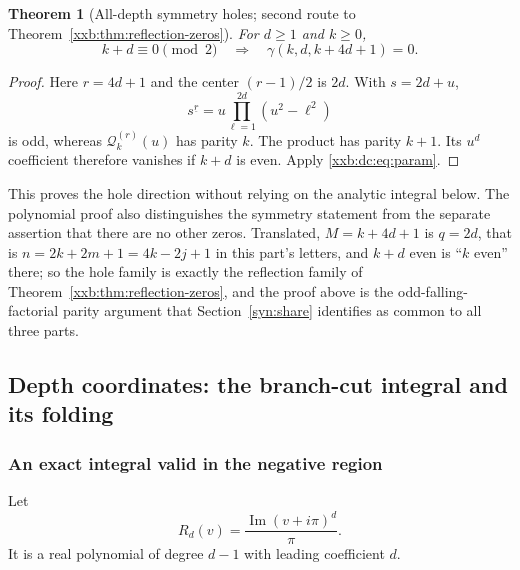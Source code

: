 \documentclass[11pt,a4paper]{article}
\numberwithin{equation}{section}
\newtheorem{theorem}{Theorem}[section]
\theoremstyle{definition}
\theoremstyle{remark}
\theoremstyle{plain}
\newcommand{\fall}[2]{#1^{\underline{#2}}}
\begin{document}
\begin{theorem}[All-depth symmetry holes; second route to Theorem~\ref{xxb:thm:reflection-zeros}]\label{xxb:dc:thm:holes}
For $d\ge1$ and $k\ge0$,
\[
 k+d\equiv0\pmod2\quad\Longrightarrow\quad
 \gamma(k,d,k+4d+1)=0.
\]
\end{theorem}
\begin{proof}
Here $r=4d+1$ and the center $(r-1)/2$ is $2d$.  With $s=2d+u$,
\[
 \fall{s}{r}=u\prod_{\ell=1}^{2d}(u^2-\ell^2)
\]
is odd, whereas $\mathcal Q_k^{(r)}(u)$ has parity $k$.  The product has parity
$k+1$.  Its $u^d$ coefficient therefore vanishes if $k+d$ is even.  Apply
\eqref{xxb:dc:eq:param}.
\end{proof}

This proves the hole direction without relying on the analytic integral
below.  The polynomial proof also distinguishes the symmetry statement
from the separate assertion that there are no other zeros.  Translated,
$M=k+4d+1$ is $q=2d$, that is $n=2k+2m+1=4k-2j+1$ in this part's letters, and
$k+d$ even is ``$k$ even'' there; so the hole family is exactly the reflection
family of Theorem~\ref{xxb:thm:reflection-zeros}, and the proof above is the
odd-falling-factorial parity argument that Section~\ref{syn:share} identifies
as common to all three parts.

\subsection{Depth coordinates: the branch-cut integral and its folding}\label{xxb:dc:sec:integral}

\subsubsection{An exact integral valid in the negative region}
Let
\begin{equation}\label{xxb:dc:eq:Rd}
 R_d(v)=\frac{\operatorname{Im}(v+i\pi)^d}{\pi}.
\end{equation}
It is a real polynomial of degree $d-1$ with leading coefficient $d$.
\end{document}

